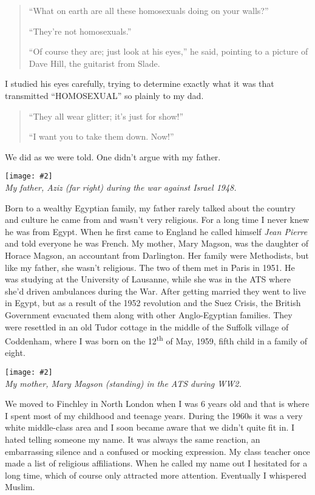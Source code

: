 \documentclass[12pt]{memoir}
\let \Sup=\textsuperscript
\newcommand{\img}[3]{\begin{center}%
\texttt{[image: \#2]}\\{\small\em#3}%
\end{center}}
\begin{document}
\begin{quote}
“What on earth are all these homosexuals doing on your walls?”

“They’re not homosexuals.”

“Of course they are; just look at his eyes,”
he said, pointing to a picture of Dave Hill, the guitarist from Slade.
\end{quote}

I studied his eyes carefully, trying to determine exactly what it was
that transmitted “HOMOSEXUAL” so plainly to my dad.

\begin{quote}
“They all wear glitter; it’s just for show!”

“I want you to take them down. Now!”
\end{quote}

We did as we were told.
One didn’t argue with my father.

\img{scale=0.8}{Hassans_Father.jpg}
{My father, Aziz (far right) during the war against Israel 1948.}

Born to a wealthy Egyptian family,
my father rarely talked about the country
and culture he came from and wasn’t very religious.
For a long time I never knew he was from Egypt.
When he first came to England he called himself \emph{Jean Pierre}
and told everyone he was French.
My mother, Mary Magson, was the daughter of Horace Magson,
an accountant from Darlington.
Her family were Methodists, but like my father, she wasn’t religious.
The two of them met in Paris in 1951.
He was studying at the University of Lausanne,
while she was in the ATS where she’d driven ambulances during the War.
After getting married they went to live in Egypt,
but as a result of the 1952 revolution and the Suez Crisis,
the British Government evacuated them
along with other Anglo-Egyptian families.
They were resettled in an old Tudor cottage in the middle
of the Suffolk village of Coddenham,
where I was born on the 12\Sup{th} of May, 1959,
fifth child in a family of eight.

\img{scale=0.7}{Hassans_Mother.jpg}
{My mother, Mary Magson (standing) in the ATS during WW2.}

We moved to Finchley in North London when I was 6 years old
and that is where I spent most of my childhood and teenage years.
During the 1960s it was a very white middle-class area
and I soon became aware that we didn’t quite fit in.
I hated telling someone my name.
It was always the same reaction,
an embarrassing silence and a confused or mocking expression.
My class teacher once made a list of religious affiliations.
When he called my name out I hesitated for a long time,
which of course only attracted more attention.
Eventually I whispered Muslim.
\end{document}
